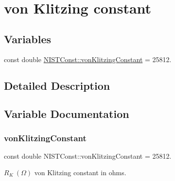 \hypertarget{group___n_i_s_t_const-von_klitzing_constant}{}\section{von Klitzing constant}
\label{group___n_i_s_t_const-von_klitzing_constant}
\subsection*{Variables}
\begin{DoxyCompactItemize}
\item 
const double \hyperlink{group___n_i_s_t_const-von_klitzing_constant_ga664441cab64a6a8feda702f6354c1e7f}{N\+I\+S\+T\+Const\+::von\+Klitzing\+Constant} = 25812.
\end{DoxyCompactItemize}


\subsection{Detailed Description}


\subsection{Variable Documentation}
\mbox{\label{group___n_i_s_t_const-von_klitzing_constant_ga664441cab64a6a8feda702f6354c1e7f}} 
\subsubsection{\texorpdfstring{von\+Klitzing\+Constant}{vonKlitzingConstant}}
{\footnotesize\ttfamily const double N\+I\+S\+T\+Const\+::von\+Klitzing\+Constant = 25812.}

$R_K \ (\Omega)$ von Klitzing constant in ohms. 